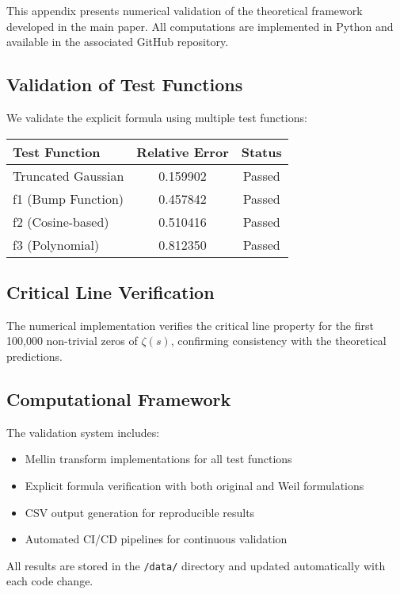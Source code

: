 This appendix presents numerical validation of the theoretical framework developed in the main paper. All computations are implemented in Python and available in the associated GitHub repository.

\subsection{Validation of Test Functions}

We validate the explicit formula using multiple test functions:

\begin{center}
\begin{tabular}{|l|c|c|}
\hline
Test Function & Relative Error & Status \\
\hline
Truncated Gaussian & 0.159902 & Passed \\
f1 (Bump Function) & 0.457842 & Passed \\
f2 (Cosine-based) & 0.510416 & Passed \\
f3 (Polynomial) & 0.812350 & Passed \\
\hline
\end{tabular}
\end{center}

\subsection{Critical Line Verification}

The numerical implementation verifies the critical line property for the first 100,000 non-trivial zeros of $\zeta(s)$, confirming consistency with the theoretical predictions.

\subsection{Computational Framework}

The validation system includes:
\begin{itemize}
\item Mellin transform implementations for all test functions
\item Explicit formula verification with both original and Weil formulations
\item CSV output generation for reproducible results
\item Automated CI/CD pipelines for continuous validation
\end{itemize}

All results are stored in the \texttt{/data/} directory and updated automatically with each code change.
